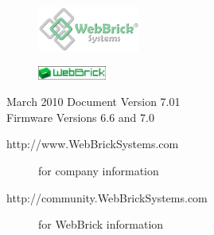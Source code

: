 \usepackage{graphicx, float, fancyheadings, a4wide, makeidx, verbatim,avant,helvet}
\usepackage{}
\pagestyle{fancyplain}
\setlength{\parindent}{0pt}
\setlength{\parskip}{6pt}


\newcommand{\param}[1] {\textless{}#1\textgreater{}}


\author{Andy Harris, Lawrence Klyne}

\makeindex



\maketitle

\begin{figure}[H]
\centering
\includegraphics[width=0.3\textwidth]{Images/WebBrickSystems.png}
\end{figure}

\begin{figure}[H]
\centering
\includegraphics[width=0.2\textwidth]{Images/wb_logo.jpg}
\end{figure}

\begin{description}
\item[March 2010 Document Version 7.01]
\item[Firmware Versions 6.6 and 7.0]
\end{description}

\begin{description}
\item[http://www.WebBrickSystems.com] for company information
\item[http://community.WebBrickSystems.com] for WebBrick information
\end{description}

\pagebreak

\tableofcontents

\pagebreak

